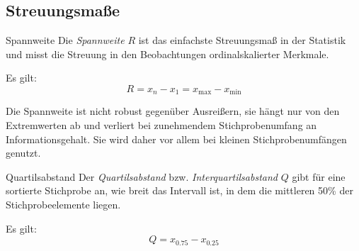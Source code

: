\subsection{Streuungsmaße}

\begin{defi}{Spannweite}
    Die \emph{Spannweite} $R$ ist das einfachste Streuungsmaß in der Statistik und misst die Streuung in den Beobachtungen ordinalskalierter Merkmale.

    Es gilt:
    \[
        R = x_n - x_1 = x_{\max} - x_{\min}
    \]

    Die Spannweite ist nicht robust gegenüber Ausreißern, sie hängt nur von den Extremwerten ab und verliert bei zunehmendem Stichprobenumfang an Informationsgehalt.
    Sie wird daher vor allem bei kleinen Stichprobenumfängen genutzt.
\end{defi}

\begin{defi}{Quartilsabstand}
    Der \emph{Quartilsabstand} bzw. \emph{Interquartilsabstand} $Q$ gibt für eine sortierte Stichprobe an, wie breit das Intervall ist, in dem die mittleren 50\% der Stichprobeelemente liegen.

    Es gilt:
    \[
        Q = x_{0.75} - x_{0.25}
    \]
\end{defi}

